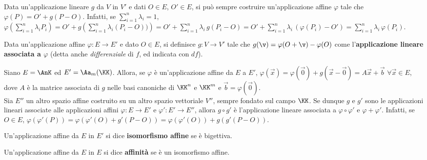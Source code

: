 \documentclass[11pt]{article}
\begin{document}
	\begin{remark}
		Data un'applicazione lineare $g$ da $V$ in $V'$ e dati $O \in E$, $O' \in E$, si può sempre costruire un'applicazione affine $\varphi$ tale che $\varphi(P) = O' + g(P - O)$. Infatti, se $\sum_{i=1}^n \lambda_i = 1$,
		$\varphi\left( \sum_{i=1}^n \lambda_i P_i \right) = O' + g\left( \sum_{i=1}^n \lambda_i (P_i - O) ) \right) =
		O' + \sum_{i=1}^n \lambda_i \, g(P_i - O) = O' + \sum_{i=1}^n \lambda_i \, (\varphi(P_i) - O') = \sum_{i=1}^n \lambda_i \, \varphi(P_i)$.
	\end{remark}
	
	\begin{definition} 
		Data un'applicazione affine $\varphi : E \to E'$ e dato $O \in E$, si definisce $g : V \to V'$ tale che
		$g(\v) = \varphi(O + \v) - \varphi(O)$ come l'\textbf{applicazione lineare associata a $\varphi$} (detta anche \textit{differenziale} di $f$, ed indicata con $df$).
	\end{definition}
	
	\begin{remark}\nl
		\li Siano $E = \AnK$ ed $E' = \Aa_m(\KK)$. Allora, se $\varphi$ è un'applicazione affine da $E$ a $E'$,
		$\varphi(\vec x) = \varphi(\vec 0) + g(\vec x - \vec 0) = A \vec x + \vec b$ $\forall \vec x \in E$, dove $A$ è la matrice associata
		di $g$ nelle basi canoniche di $\KK^n$ e $\KK^m$ e $\vec b = \varphi(\vec 0)$. \\

		\li Sia $E''$ un altro spazio affine costruito su un altro spazio
		vettoriale $V''$, sempre fondato sul campo $\KK$. Se dunque $g$ e $g'$ sono le applicazioni lineari associate alle applicazioni affini $\varphi : E \to E'$ e $\varphi' : E' \to E''$,
		allora $g \circ g'$ è l'applicazione lineare associata a $\varphi \circ \varphi'$ e
		$\varphi + \varphi'$. Infatti, se $O \in E$, $\varphi(\varphi'(P)) = \varphi(\varphi'(O) + g'(P-O)) =
		\varphi(\varphi'(O)) + g(g'(P-O))$.
	\end{remark}
	
	\begin{definition}  Un'applicazione affine da $E$ in $E'$ si dice \textbf{isomorfismo affine} se è bigettiva.
	\end{definition}
	
	\begin{definition} [affinità] Un'applicazione affine da $E$ in $E$ si dice \textbf{affinità} se è un isomorfismo affine.
	\end{definition}
	
\end{document}

